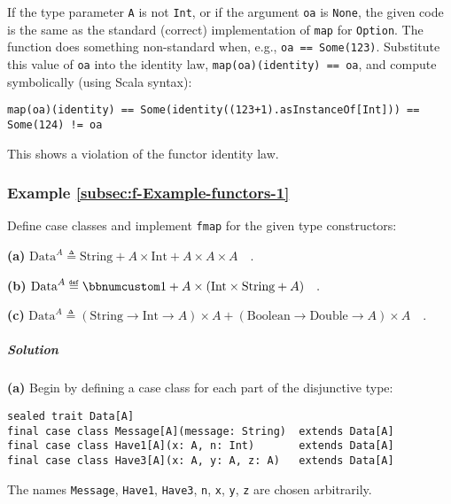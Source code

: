 If the type parameter \lstinline!A! is not \lstinline!Int!, or if
the argument \lstinline!oa! is \lstinline!None!, the given code
is the same as the standard (correct) implementation of \lstinline!map!
for \lstinline!Option!. The function does something non-standard
when, e.g., \lstinline!oa == Some(123)!. Substitute this value of
\lstinline!oa! into the identity law, \lstinline!map(oa)(identity) == oa!,
and compute symbolically (using Scala syntax):
\begin{lstlisting}
map(oa)(identity) == Some(identity((123+1).asInstanceOf[Int])) == Some(124) != oa
\end{lstlisting}
This shows a violation of the functor identity law.

\subsubsection{Example \label{subsec:f-Example-functors-1}\ref{subsec:f-Example-functors-1}}

Define case classes and implement \lstinline!fmap! for the given
type constructors:

\textbf{(a)} $\text{Data}^{A}\triangleq\text{String}+A\times\text{Int}+A\times A\times A\quad.$

\textbf{(b)} $\text{Data}^{A}\triangleq\bbnum 1+A\times(\text{Int}\times\text{String}+A)\quad.$

\textbf{(c)} $\text{Data}^{A}\triangleq(\text{String}\rightarrow\text{Int}\rightarrow A)\times A+(\text{Boolean}\rightarrow\text{Double}\rightarrow A)\times A\quad.$

\subparagraph{Solution}

\textbf{(a)} Begin by defining a case class for each part of the disjunctive
type:
\begin{lstlisting}
sealed trait Data[A] 
final case class Message[A](message: String)  extends Data[A]
final case class Have1[A](x: A, n: Int)       extends Data[A]  
final case class Have3[A](x: A, y: A, z: A)   extends Data[A]
\end{lstlisting}
The names \lstinline!Message!, \lstinline!Have1!, \lstinline!Have3!,
\lstinline!n!, \lstinline!x!, \lstinline!y!, \lstinline!z! are
chosen arbitrarily. 

